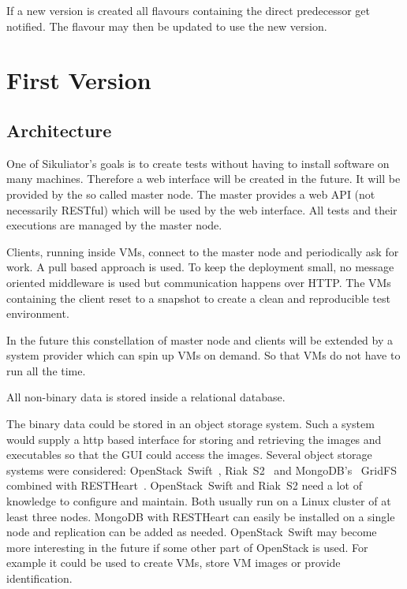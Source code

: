\documentclass[a4paper,twocolumn,twoside]{article}
\newcommand{\Sik}[0]{Sikuliator}
\begin{document}
If a new version is created all flavours containing the direct predecessor get notified.
The flavour may then be updated to use the new version.

\section{First Version}
\subsection{Architecture}
One of \Sik{}'s goals is to create tests without having to install software on many machines.
Therefore a web interface will be created in the future.
It will be provided by the so called master node.
The master provides a web API (not necessarily RESTful) which will be used by the web interface.
All tests and their executions are managed by the master node.

Clients, running inside VMs, connect to the master node and periodically ask for work.
A pull based approach is used.
To keep the deployment small, no message oriented middleware is used but communication happens over HTTP.
The VMs containing the client reset to a snapshot to create a clean and reproducible test environment.

In the future this constellation of master node and clients will be extended by a system provider which can spin up VMs on demand.
So that VMs do not have to run all the time.

All non-binary data is stored inside a relational database.

The binary data could be stored in an object storage system.
Such a system would supply a http based interface for storing and retrieving the images and executables
so that the GUI could access the images.
Several object storage systems were considered: OpenStack~Swift~\cite{OpenStackSwift}, Riak~S2~\cite{RiakS2} and 
MongoDB's~\cite{MongoDB} GridFS~\cite{GridFS} combined with RESTHeart~\cite{RESTHeart}.
OpenStack~Swift and Riak~S2 need a lot of knowledge to configure and maintain.
Both usually run on a Linux cluster of at least three nodes.
MongoDB with RESTHeart can easily be installed on a single node and replication can be added as needed.
OpenStack~Swift may become more interesting in the future if some other part of OpenStack is used.
For example it could be used to create VMs, store VM images or provide identification.
\end{document}
